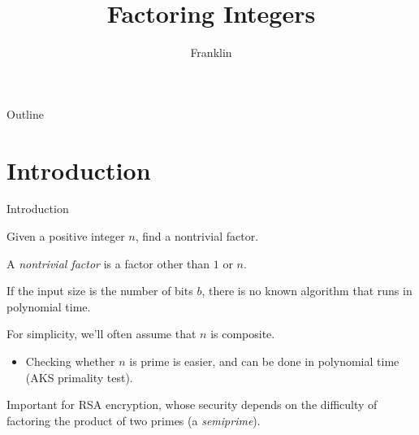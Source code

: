 \documentclass[aspectratio=169]{beamer}
\title{Factoring Integers}
\author{Franklin}
\date{}
\begin{document}

\begin{frame}
\titlepage
\end{frame}

\begin{frame}{Outline}
  \tableofcontents
\end{frame}


\section{Introduction}

\begin{frame}{Introduction}
  
  \begin{tcolorbox}[title=Problem,colbacktitle=sigma@mainblue]
    
  Given a positive integer $n$, find a nontrivial factor.
  \end{tcolorbox}

  A \textit{nontrivial factor} is a factor other than $1$ or $n$. \pause
  
  If the input size is the number of bits $b$,
  there is no known algorithm that runs in polynomial time. \pause

  For simplicity, we'll often assume that $n$ is composite.
  \begin{itemize}
    \item Checking whether $n$ is prime is easier, and can be done in polynomial time
    (AKS primality test).
  \end{itemize} \pause

  Important for RSA encryption, whose security depends on the
  difficulty of factoring the product of two primes (a \textit{semiprime}).

\end{frame}
\end{document}
